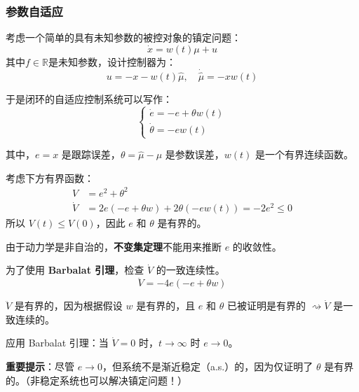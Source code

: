 \begin{frame}
    \frametitle{参数自适应}

    考虑一个简单的具有未知参数的被控对象的镇定问题：
    \begin{equation}
        \dot{x}=w(t) \mu +u
    \end{equation}
    其中$f\in\mathbb{R}$是未知参数，设计控制器为：
    \begin{equation}
        u=-x-w(t)\hat{\mu},
        \quad
        \dot{\hat{\mu}}=-xw(t)
    \end{equation}

    于是闭环的自适应控制系统可以写作：
    \[
    \begin{cases}
    \dot{e} = -e + \theta w(t) \\
    \dot{\theta} = -e w(t)
    \end{cases}
    \]

    其中，\( e=x \) 是跟踪误差，\( \theta=\hat{\mu}-\mu \) 是参数误差，\( w(t) \) 是一个有界连续函数。
\end{frame}

\begin{frame}
考虑下方有界函数：
\[
\begin{split}
V &= e^2 + \theta^2 \\
\dot{V} &= 2e(-e + \theta w) + 2\theta(-ew(t)) = -2e^2 \leq 0
\end{split}
\]
所以 \( V(t) \leq V(0) \)，因此 \( e \) 和 \( \theta \) 是有界的。

由于动力学是非自治的，\textbf{不变集定理}不能用来推断 \( e \) 的收敛性。

为了使用 \textbf{Barbalat 引理}，检查 \( \dot{V} \) 的一致连续性。
\[
\ddot{V} = -4e(-e + \theta w)
\]

\( \ddot{V} \) 是有界的，因为根据假设 \( w \) 是有界的，且 \( e \) 和 \( \theta \) 已被证明是有界的 \( \rightsquigarrow \dot{V} \) 是一致连续的。

应用 Barbalat 引理：当 \( \dot{V} = 0 \) 时，\( t \to \infty \) 时 \( e \to 0 \)。

\textbf{重要提示}：尽管 \( e \to 0 \)，但系统不是渐近稳定（a.s.）的，因为仅证明了 \( \theta \) 是有界的。（非稳定系统也可以解决镇定问题！）
\end{frame}


